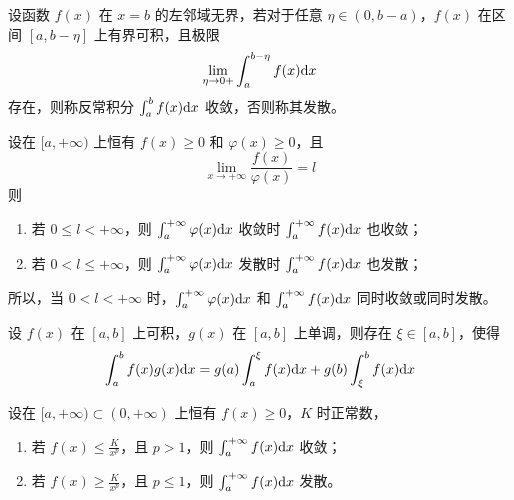 \documentclass{ctexbook}
\def\diff{\textnormal{d}}
\begin{document}
\begin{definition}[无界函数反常积分]
    设函数 $f(x)$ 在 $x=b$ 的左邻域无界，若对于任意 $\eta\in(0,b-a)$，$f(x)$ 在区间 $[a,b-\eta]$ 上有界可积，且极限
    \begin{equation}
        \lim_{\eta\rightarrow 0+}\int_a^{b-\eta}f(x)\diff x
    \end{equation}
    存在，则称反常积分 $\int_a^b f(x)\diff x$ 收敛，否则称其发散。
\end{definition}

\begin{theorem}[比较判别法]
    设在 $[a,+\infty)$ 上恒有 $f(x)\geq 0$ 和 $\varphi(x)\geq 0$，且
    \begin{equation}
        \lim_{x\rightarrow +\infty}\frac{f(x)}{\varphi(x)}=l
    \end{equation}
    则
    \begin{enumerate}
        \item 若 $0\leq l<+\infty$，则 $\int_a^{+\infty}\varphi(x)\diff x$ 收敛时 $\int_a^{+\infty}f(x)\diff x$ 也收敛；
        \item 若 $0<l\leq+\infty$，则 $\int_a^{+\infty}\varphi(x)\diff x$ 发散时 $\int_a^{+\infty}f(x)\diff x$ 也发散；
    \end{enumerate}
    所以，当 $0<l<+\infty$ 时，$\int_a^{+\infty}\varphi(x)\diff x$ 和 $\int_a^{+\infty}f(x)\diff x$ 同时收敛或同时发散。
\end{theorem}

\begin{theorem}[积分第二中值定理]
    设 $f(x)$ 在 $[a,b]$ 上可积，$g(x)$ 在 $[a,b]$ 上单调，则存在 $\xi\in[a,b]$，使得
    \begin{equation}
        \int_a^b f(x)g(x)\diff x=g(a)\int_a^\xi f(x)\diff x+g(b)\int_\xi^b f(x)\diff x
    \end{equation}
\end{theorem}

\begin{theorem}
    设在 $[a,+\infty)\subset(0,+\infty)$ 上恒有 $f(x)\geq 0$，$K$ 时正常数，
    \begin{enumerate}
        \item 若 $f(x)\leq\frac{K}{x^p}$，且 $p>1$，则 $\int_a^{+\infty}f(x)\diff x$ 收敛；
        \item 若 $f(x)\geq\frac{K}{x^p}$，且 $p\leq 1$，则 $\int_a^{+\infty}f(x)\diff x$ 发散。
    \end{enumerate}
\end{theorem}
\end{document}

